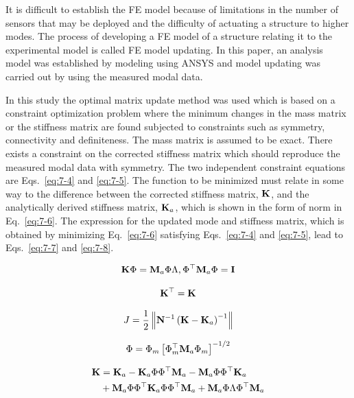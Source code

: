 It is difficult to establish the FE model because of limitations in the number of sensors that may be deployed and the difficulty of actuating a structure to higher modes. The process of developing a FE model of a structure relating it to the experimental model is called FE model updating\citep{bagchi2005updating}. In this paper, an analysis model was established by modeling using ANSYS and model updating was carried out by using the measured modal data.

In this study the optimal matrix update method was used which is based on a constraint optimization problem where the minimum changes in the mass matrix or the stiffness matrix are found subjected to constraints such as symmetry, connectivity and definiteness\citep{baruch1978optimization, baruch1979optimal}. The mass matrix is assumed to be exact. There exists a constraint on the corrected stiffness matrix which should reproduce the measured modal data with symmetry. The two independent constraint equations are Eqs.~\eqref{eq:7-4} and \eqref{eq:7-5}. The function to be minimized must relate in some way to the difference between the corrected stiffness matrix, $\mathbf{K}$, and the analytically derived stiffness matrix, $\mathbf{K}_{a}$, which is shown in the form of norm in Eq.~\eqref{eq:7-6}. The expression for the updated mode and stiffness matrix, which is obtained by minimizing Eq.~\eqref{eq:7-6} satisfying Eqs.~\eqref{eq:7-4} and \eqref{eq:7-5}, lead to Eqs.~\eqref{eq:7-7} and \eqref{eq:7-8}\citep{baruch1979optimal, baruch1978optimization}.

\begin{equation}\label{eq:7-4}
\mathbf{K}\Phi = \mathbf{M}_{a}\Phi\Lambda, \Phi^{\top}\mathbf{M}_{a}\Phi = \mathbf{I}
\end{equation}

\begin{equation}\label{eq:7-5}
\mathbf{K}^{\top} = \mathbf{K}
\end{equation}

\begin{equation}\label{eq:7-6}
J=\frac{1}{2}\left\| \mathbf{N}^{-1}\left(\mathbf{K}-\mathbf{K}_{a}\right)^{-1}\right\|
\end{equation}

\begin{equation}\label{eq:7-7}
\Phi = \Phi_{m} \left[ \Phi_{m}^{\top}\mathbf{M}_{a}\Phi_{m}\right]^{-1/2}
\end{equation}

\begin{equation}\label{eq:7-8}
\begin{aligned}
\mathbf{K}&=\mathbf{K}_{a} - \mathbf{K}_{a}\Phi\Phi^{\top}\mathbf{M}_{a}-\mathbf{M}_{a}\Phi\Phi^{\top}\mathbf{K}_{a}\\
&+\mathbf{M}_{a}\Phi\Phi^{\top}\mathbf{K}_{a}\Phi\Phi^{\top}\mathbf{M}_{a} + \mathbf{M}_{a}\Phi\Lambda\Phi^{\top}\mathbf{M}_{a}
\end{aligned}
\end{equation}

